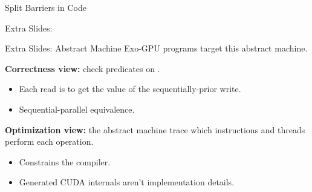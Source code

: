 \documentclass[aspectratio=169]{beamer}
\begin{document}
\begin{frame}[label=split_marks]{Split Barriers in Code}

\end{frame}

\sporkExtraSlides

\begin{frame}[label=extra_ring]{Extra Slides: %
    }
\scriptsize
{}
\normalsize
\vfill
{}%
\vspace{3mm}
\end{frame}

\begin{frame}[label=extra_machine]{Extra Slides: Abstract Machine}
Exo-GPU programs target this abstract machine.
\medskip

\textbf{Correctness view:} check predicates on .
\begin{itemize}
  \item Each read is  to get the value of the sequentially-prior write.
  \item Sequential-parallel equivalence.
\end{itemize}
\medskip

\textbf{Optimization view:} the abstract machine trace  which instructions and threads perform each operation.
\begin{itemize}
  \item Constrains the compiler.
  \item Generated CUDA internals aren't implementation details.
\end{itemize}
\end{frame}
\end{document}
